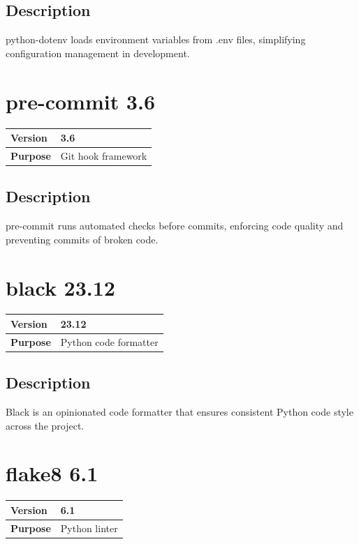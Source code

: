 \documentclass[12pt,a4paper]{report}
\begin{document}
\subsection{Description}

python-dotenv loads environment variables from .env files, simplifying configuration management in development.

\section{pre-commit 3.6}

\begin{tabular}{|p{4cm}|p{10cm}|}
\hline
\textbf{Version} & 3.6 \\
\hline
\textbf{Purpose} & Git hook framework \\
\hline
\end{tabular}

\subsection{Description}

pre-commit runs automated checks before commits, enforcing code quality and preventing commits of broken code.

\section{black 23.12}

\begin{tabular}{|p{4cm}|p{10cm}|}
\hline
\textbf{Version} & 23.12 \\
\hline
\textbf{Purpose} & Python code formatter \\
\hline
\end{tabular}

\subsection{Description}

Black is an opinionated code formatter that ensures consistent Python code style across the project.

\section{flake8 6.1}

\begin{tabular}{|p{4cm}|p{10cm}|}
\hline
\textbf{Version} & 6.1 \\
\hline
\textbf{Purpose} & Python linter \\
\hline
\end{tabular}
\end{document}
